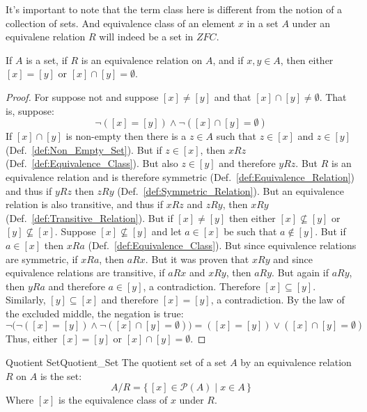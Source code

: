     It's important to note that the term class here is different from the notion
    of a collection of sets. And equivalence class of an element $x$ in a set
    $A$ under an equivalene relation $R$ will indeed be a set in $ZFC$.
    \begin{theorem}
        \label{thm:Equivalence_Classes_Disjoint_or_Equal}%
        If $A$ is a set, if $R$ is an equivalence relation on $A$, and if
        $x,y\in{A}$, then either $[x]=[y]$ or $[x]\cap[y]=\emptyset$.
    \end{theorem}
    \begin{proof}
        For suppose not and suppose $[x]\ne[y]$ and that
        $[x]\cap[y]\ne\emptyset$. That is, suppose:
        \begin{equation*}
            \neg([x]=[y])\land\neg([x]\cap[y]=\emptyset)
        \end{equation*}
        If $[x]\cap[y]$ is non-empty then there is a
        $z\in{A}$ such that $z\in[x]$ and $z\in[y]$
        (Def.~\ref{def:Non_Empty_Set}). But if $z\in[x]$, then $xRz$
        (Def.~\ref{def:Equivalence_Class}). But also
        $z\in[y]$ and therefore $yRz$. But $R$ is an equivalence relation and
        is therefore symmetric (Def.~\ref{def:Equivalence_Relation}) and thus
        if $yRz$ then $zRy$ (Def.~\ref{def:Symmetric_Relation}). But an
        equivalence relation is also transitive, and thus if $xRz$ and $zRy$,
        then $xRy$ (Def.~\ref{def:Transitive_Relation}). But if $[x]\ne[y]$ then
        either $[x]\nsubseteq[y]$ or $[y]\nsubseteq[x]$. Suppose
        $[x]\nsubseteq[y]$ and let $a\in[x]$ be such that $a\notin[y]$. But
        if $a\in[x]$ then $xRa$ (Def.~\ref{def:Equivalence_Class}). But since
        equivalence relations are symmetric, if $xRa$, then $aRx$. But it was
        proven that $xRy$ and since equivalence relations are transitive, if
        $aRx$ and $xRy$, then $aRy$. But again if $aRy$, then $yRa$ and
        therefore $a\in[y]$, a contradiction. Therefore $[x]\subseteq[y]$.
        Similarly, $[y]\subseteq[x]$ and therefore $[x]=[y]$, a contradiction.
        By the law of the excluded middle, the negation is true:
        \begin{equation*}
            \neg\big(\neg([x]=[y])\land\neg([x]\cap[y]=\emptyset)\big)
            =([x]=[y])\lor([x]\cap[y]=\emptyset)
        \end{equation*}
        Thus, either $[x]=[y]$ or $[x]\cap[y]=\emptyset$.
    \end{proof}
    \begin{fdefinition}{Quotient Set}{Quotient_Set}
        The quotient set of a set $A$ by an equivalence relation $R$ on $A$ is
        the set:
        \begin{equation*}
            A/R=\{\,[x]\in\mathcal{P}(A)\;|\;x\in{A}\,\}
        \end{equation*}
        Where $[x]$ is the equivalence class of $x$ under $R$.
    \end{fdefinition}
